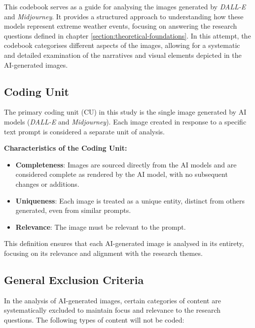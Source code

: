 \label{appendix:codebook}

This codebook serves as a guide for analysing the images generated by \textit{DALL-E} and \textit{Midjourney}. It provides a structured approach to understanding how these models represent extreme weather events, focusing on answering the research questions defined in chapter \ref{section:theoretical-foundations}. In this attempt, the codebook categorises different aspects of the images, allowing for a systematic and detailed examination of the narratives and visual elements depicted in the AI-generated images.

\subsection{Coding Unit}
The primary coding unit (CU) in this study is the single image generated by AI models (\textit{DALL-E} and \textit{Midjourney}). Each image created in response to a specific text prompt is considered a separate unit of analysis.


\textbf{Characteristics of the Coding Unit:
}
\begin{itemize}
    \item \textbf{Completeness}: Images are sourced directly from the AI models and are considered complete as rendered by the AI model, with no subsequent changes or additions.
    \item \textbf{Uniqueness}: Each image is treated as a unique entity, distinct from others generated, even from similar prompts.
    \item \textbf{Relevance}: The image must be relevant to the prompt.
\end{itemize}

This definition ensures that each AI-generated image is analysed in its entirety, focusing on its relevance and alignment with the research themes.

\subsection{General Exclusion Criteria}
In the analysis of AI-generated images, certain categories of content are systematically excluded to maintain focus and relevance to the research questions. The following types of content will not be coded:

